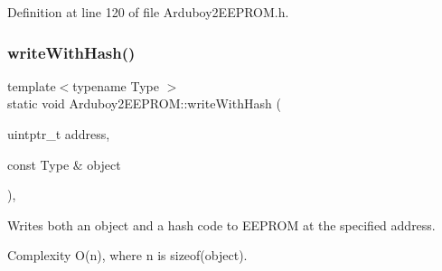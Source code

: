 Definition at line 120 of file Arduboy2\+E\+E\+P\+R\+O\+M.\+h.

\mbox{\label{classArduboy2EEPROM_a55111051528b8d43a03bd7dd842b0679}} 
\subsubsection{\texorpdfstring{writeWithHash()}{writeWithHash()}\hspace{0.1cm}{\footnotesize\ttfamily [1/2]}}
{\footnotesize\ttfamily template$<$typename Type $>$ \\
static void Arduboy2\+E\+E\+P\+R\+O\+M\+::write\+With\+Hash (\begin{DoxyParamCaption}\item[{uintptr\+\_\+t}]{address,  }\item[{const Type \&}]{object }\end{DoxyParamCaption})\hspace{0.3cm}{\ttfamily [inline]}, {\ttfamily [static]}}



Writes both an object and a hash code to E\+E\+P\+R\+OM at the specified address. 

\begin{DoxyParagraph}{Complexity}
{\ttfamily O(n)}, where {\ttfamily n} is {\ttfamily sizeof(object)}.
\end{DoxyParagraph}

